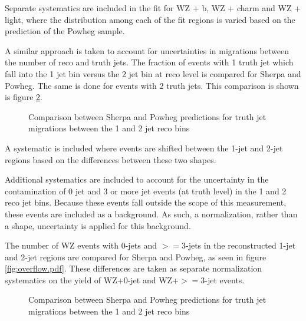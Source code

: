 Separate systematics are included in the fit for WZ + b, WZ + charm and WZ + light, where the distribution among each of the fit regions is varied based on the prediction of the Powheg sample.

A similar approach is taken to account for uncertainties in migrations between the number of reco and truth jets. The fraction of events with 1 truth jet which fall into the 1 jet bin versus the 2 jet bin at reco level is compared for Sherpa and Powheg. The same is done for events with 2 truth jets. This comparison is shown is figure \ref{fig:migration12}.

\begin{figure}[H]
    \centering
    \caption{Comparison between Sherpa and Powheg predictions for truth jet migrations between the 1 and 2 jet reco bins}
\label{fig:migration12}
\end{figure}

A systematic is included where events are shifted between the 1-jet and 2-jet regions based on the differences between these two shapes.

Additional systematics are included to account for the uncertainty in the contamination of 0 jet and 3 or more jet events (at truth level) in the 1 and 2 reco jet bins. Because these events fall outside the scope of this measurement, these events are included as a background. As such, a normalization, rather than a shape, uncertainty is applied for this background.

The number of WZ events with 0-jets and $>=$3-jets in the reconstructed 1-jet and 2-jet regions are compared for Sherpa and Powheg, as seen in figure \ref{fig:overflow.pdf}. These differences are taken as separate normalization systematics on the yield of WZ+0-jet and WZ+$>=$3-jet events.

\begin{figure}[H]
    \centering
    \caption{Comparison between Sherpa and Powheg predictions for truth jet migrations between the 1 and 2 jet reco bins}
\label{fig:migration12}
\end{figure} 
